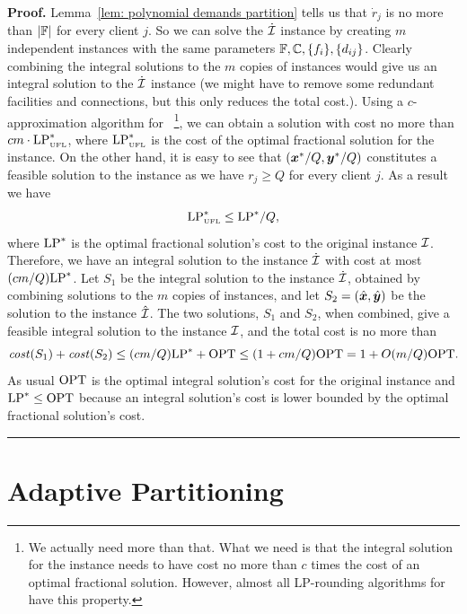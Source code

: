 \documentclass[oneside,final]{ucr}
\newenvironment{proof}[1][Proof]{\textbf{#1.} }{\ \rule{0.5em}{0.5em}}
\begin{document}
\begin{proof}
  Lemma~\ref{lem: polynomial demands partition} tells us
  that $\dot r_j$ is no more than $|\mathbb{F}|$ for every
  client $j$. So we can solve the $\dot {\mathcal{I}}$ instance by
  creating $m$ independent {\UFL} instances with the same
  parameters $\mathbb{F}, \mathbb{C}, \{f_i\},
  \{d_{ij}\}$. Clearly combining the integral solutions to
  the $m$ copies of {\UFL} instances would give us an
  integral solution to the $\dot {\mathcal{I}}$ instance (we might
  have to remove some redundant facilities and connections,
  but this only reduces the total cost.). Using a
  $c$-approximation algorithm for {\UFL}~\footnote{We
    actually need more than that. What we need is that the
    integral solution for the {\UFL} instance needs to have
    cost no more than $c$ times the cost of an optimal
    fractional solution. However, almost all LP-rounding
    algorithms for {\UFL} have this property.}, we can
  obtain a solution with cost no more than $c m \cdot
  \mbox{\rm LP}_{\mbox{\tiny\rm UFL}}^\ast$, where $\mbox{\rm LP}_{\mbox{\tiny\rm UFL}}^\ast$ is the
  cost of the optimal fractional solution for the {\UFL}
  instance. On the other hand, it is easy to see that
  $(\boldsymbol{x}^\ast/Q,\boldsymbol{y}^\ast/Q)$ constitutes a feasible
  solution to the {\UFL} instance as we have $r_j \geq Q$
  for every client $j$. As a result we have
  \begin{equation*}
    \mbox{\rm LP}_{\mbox{\tiny\rm UFL}}^\ast \leq \mbox{\rm LP}^\ast / Q,
  \end{equation*}
  where $\mbox{\rm LP}^\ast$ is the optimal fractional solution's cost
  to the original {\FTFP} instance $\mathcal{I}$. Therefore, we
  have an integral solution to the instance $\dot{\mathcal{I}}$ with
  cost at most $(cm/Q) \mbox{\rm LP}^\ast$. Let $S_1$ be the integral
  solution to the instance $\dot{\mathcal{I}}$, obtained by
  combining solutions to the $m$ copies of {\UFL} instances,
  and let $S_2 = (\hat{\boldsymbol{x}},\hat{\boldsymbol{y}})$ be the solution to the
  instance $\hat{\mathcal{I}}$. The two solutions, $S_1$ and $S_2$,
  when combined, give a feasible integral solution to the
  instance $\mathcal{I}$, and the total cost is no more than
  \begin{equation*}
    {\it cost}(S_1) + {\it cost}(S_2) \leq (cm/Q) \mbox{\rm LP}^\ast + \mbox{\rm OPT} \leq (1 +
    cm/Q) \mbox{\rm OPT} = 1 + O(m/Q) \mbox{\rm OPT}.
  \end{equation*}
  As usual $\mbox{\rm OPT}$ is the optimal integral solution's cost
  for the original {\FTFP} instance and $\mbox{\rm LP}^\ast \leq \mbox{\rm OPT}$
  because an integral solution's cost is lower bounded by
  the optimal fractional solution's cost.
\end{proof}


\section{Adaptive Partitioning}
\label{sec: adaptive partitioning}
\end{document}

